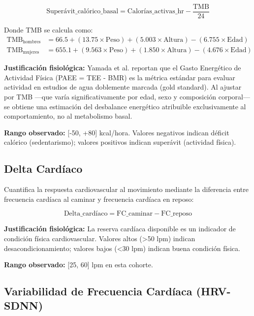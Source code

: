 \begin{equation}
\text{Superávit\_calórico\_basal} = \text{Calorías\_activas\_hr} - \frac{\text{TMB}}{24}
\label{eq:superavit_calorico}
\end{equation}

Donde TMB se calcula como:
\begin{align}
\text{TMB}_{\text{hombres}} &= 66.5 + (13.75 \times \text{Peso}) + (5.003 \times \text{Altura}) - (6.755 \times \text{Edad}) \\
\text{TMB}_{\text{mujeres}} &= 655.1 + (9.563 \times \text{Peso}) + (1.850 \times \text{Altura}) - (4.676 \times \text{Edad})
\end{align}

\textbf{Justificación fisiológica:} Yamada et al. \cite{Yamada2019} reportan que el Gasto Energético de Actividad Física (PAEE = TEE - BMR) es la métrica estándar para evaluar actividad en estudios de agua doblemente marcada (gold standard). Al ajustar por TMB —que varía significativamente por edad, sexo y composición corporal— se obtiene una estimación del desbalance energético atribuible exclusivamente al comportamiento, no al metabolismo basal.

\textbf{Rango observado:} [-50, +80] kcal/hora. Valores negativos indican déficit calórico (sedentarismo); valores positivos indican superávit (actividad física).

\subsection{Delta Cardíaco}
\label{subsec:delta_cardiaco}

Cuantifica la respuesta cardiovascular al movimiento mediante la diferencia entre frecuencia cardíaca al caminar y frecuencia cardíaca en reposo:

\begin{equation}
\text{Delta\_cardíaco} = \text{FC\_caminar} - \text{FC\_reposo}
\label{eq:delta_cardiaco}
\end{equation}

\textbf{Justificación fisiológica:} La reserva cardíaca disponible es un indicador de condición física cardiovascular. Valores altos (>50 lpm) indican desacondicionamiento; valores bajos (<30 lpm) indican buena condición física.

\textbf{Rango observado:} [25, 60] lpm en esta cohorte.

\subsection{Variabilidad de Frecuencia Cardíaca (HRV-SDNN)}
\label{subsec:hrv_sdnn}

